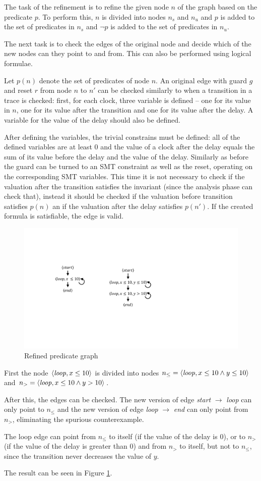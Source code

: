 The task of the refinement is to refine the given node $n$ of the graph based on the predicate $p$. To perform this, $n$ is divided into nodes $n_s$ and $n_u$ and $p$ is added to the set of predicates in $n_s$ and $\neg p$ is added to the set of predicates in $n_u$.

The next task is to check the edges of the original node and decide which of the new nodes can they point to and from. This can also be performed using logical formulae.

Let $p(n)$ denote the set of predicates of node $n$. An original edge with guard $g$ and reset $r$ from node $n$ to $n'$ can be checked similarly to when a transition in a trace is checked: first, for each clock, three variable is defined -- one for its value in $n$, one for its value after the transition and one for its value after the delay. A variable for the value of the delay should also be defined.

After defining the variables, the trivial constrains must be defined: all of the defined variables are at least 0 and the value of a clock after the delay equals the sum of its value before the delay and the value of the delay. Similarly as before the guard can be turned to an SMT constraint as well as the reset, operating on the corresponding SMT variables. This time it is not necessary to check if the valuation after the transition satisfies the invariant (since the analysis phase can check that), instead it should be checked if the valuation before transition satisfies $p(n)$ an if the valuation after the delay satisfies $p(n')$. If the created formula is satisfiable, the edge is valid.

\begin{figure} 
	\centering
	\includegraphics[width=.3\textwidth]{include/figures/runex_pred_ref}
	\caption{Refined predicate graph}
	\label{fig:predref}
\end{figure}

\begin{runningExample}
	First the node $ \langle \text{\emph{loop}}, x \leq 10 \rangle$ is divided into nodes $ n_\leq = \langle \text{\emph{loop}}, x \leq 10 \wedge y \leq 10 \rangle$ and $n_> = \langle \text{\emph{loop}}, x \leq 10 \wedge y>10 \rangle$.
	
	After this, the edges can be checked. The new version of edge \emph{start} $\to$ \emph{loop} can only point to $n_\leq$ and the new version of edge \emph{loop} $\to$ \emph{end} can only point from $n_>$, eliminating the spurious counterexample.
	
	The loop edge can point from $n_\leq$ to itself (if the value of the delay is 0), or to $n_>$ (if the value of the delay is greater than 0) and from $n_>$ to itself, but not to $n_\leq$, since the transition never decreases the value of $y$.
	
	The result can be seen in Figure \ref{fig:predref}.
	
\end{runningExample}

